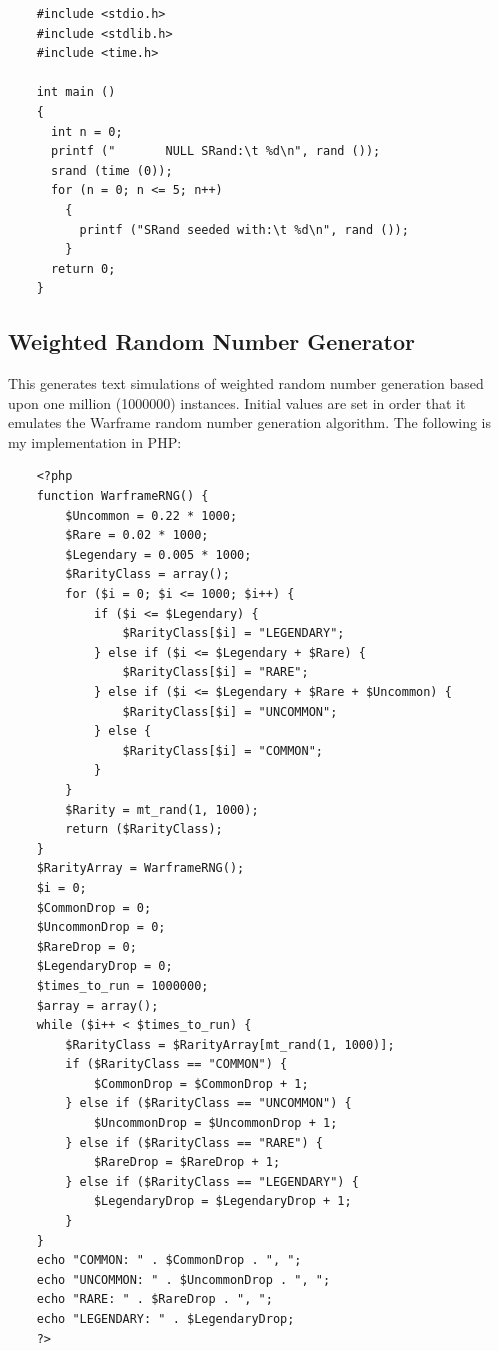 \documentclass[12pt]{article}
\begin{document}
\begin{verbatim}
    #include <stdio.h>
    #include <stdlib.h>
    #include <time.h>
    
    int main ()
    {
      int n = 0;
      printf ("       NULL SRand:\t %d\n", rand ());
      srand (time (0));
      for (n = 0; n <= 5; n++)
        {
          printf ("SRand seeded with:\t %d\n", rand ());
        }
      return 0;
    }
\end{verbatim}

\subsection{Weighted Random Number Generator}

This generates text simulations of weighted random number generation based upon one million (1000000) instances. Initial values are set in order that it emulates the Warframe random number generation algorithm. The following is my implementation in PHP:

\begin{verbatim}
    <?php
    function WarframeRNG() {
        $Uncommon = 0.22 * 1000;
        $Rare = 0.02 * 1000;
        $Legendary = 0.005 * 1000;
        $RarityClass = array();
        for ($i = 0; $i <= 1000; $i++) {
            if ($i <= $Legendary) {
                $RarityClass[$i] = "LEGENDARY";
            } else if ($i <= $Legendary + $Rare) {
                $RarityClass[$i] = "RARE";
            } else if ($i <= $Legendary + $Rare + $Uncommon) {
                $RarityClass[$i] = "UNCOMMON";
            } else {
                $RarityClass[$i] = "COMMON";
            }
        }
        $Rarity = mt_rand(1, 1000);
        return ($RarityClass);
    }
    $RarityArray = WarframeRNG();
    $i = 0;
    $CommonDrop = 0;
    $UncommonDrop = 0;
    $RareDrop = 0;
    $LegendaryDrop = 0;
    $times_to_run = 1000000;
    $array = array();
    while ($i++ < $times_to_run) {
        $RarityClass = $RarityArray[mt_rand(1, 1000)];
        if ($RarityClass == "COMMON") {
            $CommonDrop = $CommonDrop + 1;
        } else if ($RarityClass == "UNCOMMON") {
            $UncommonDrop = $UncommonDrop + 1;
        } else if ($RarityClass == "RARE") {
            $RareDrop = $RareDrop + 1;
        } else if ($RarityClass == "LEGENDARY") {
            $LegendaryDrop = $LegendaryDrop + 1;
        }
    }
    echo "COMMON: " . $CommonDrop . ", ";
    echo "UNCOMMON: " . $UncommonDrop . ", ";
    echo "RARE: " . $RareDrop . ", ";
    echo "LEGENDARY: " . $LegendaryDrop;
    ?>
\end{verbatim}
\end{document}
